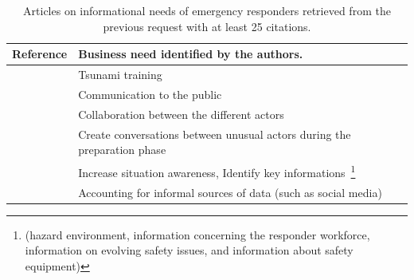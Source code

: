 \begin{table}[bp]
    \centering
    \renewcommand{\arraystretch}{1.5}
    \caption{Articles on informational needs of emergency responders retrieved from the previous request with at least 25 citations.}
    \begin{tabular}{m{} m{}}
        Reference                                                   & Business need identified by the authors.                                                                                                                                                                               \\ [0.5ex]
        \toprule
        \cite{lindellTsunamiPreparednessOregon2010}                 & Tsunami training                                                                                                                                                                                                       \\
        \cite{aloudatRegulationUbiquitousMobile2011}                & Communication to the public                                                                                                                                                                                            \\
        \cite{berlinWhyCollaborationMinimised2011}                  & Collaboration between the different actors                                                                                                                                                                             \\
        \cite{parkerSurfaceWaterFlood2011}                          & Create conversations between unusual actors during the preparation phase                                                                                                                                               \\
        \cite{yangDesignPrinciplesIntegrated2012}                   & Increase situation awareness, Identify key informations~\footnote{(hazard environment, information concerning the responder workforce, information on evolving safety issues, and information about safety equipment)} \\
        \cite{tapiaTrustworthyTweetDeeper2013}                      & Accounting for informal sources of data (such as social media)                                                                                                                                                         \\

\end{tabular}
\end{table}
